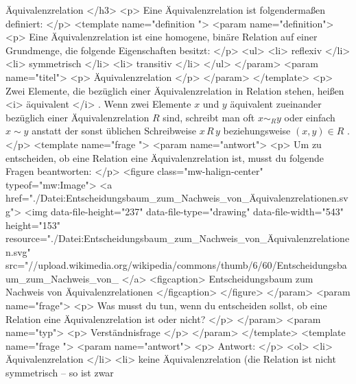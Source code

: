    Äquivalenzrelation
  </h3>
  <p>
   Eine Äquivalenzrelation ist folgendermaßen definiert:
  </p>
  <template name="definition
 ">
   <param name="definition">
    <p>
     Eine Äquivalenzrelation ist eine homogene, binäre Relation auf einer Grundmenge, die folgende Eigenschaften besitzt:
    </p>
    <ul>
     <li>
      reflexiv
     </li>
     <li>
      symmetrisch
     </li>
     <li>
      transitiv
     </li>
    </ul>
   </param>
   <param name="titel">
    <p>
     Äquivalenzrelation
    </p>
   </param>
  </template>
  <p>
   Zwei Elemente, die bezüglich einer Äquivalenzrelation in Relation stehen, heißen
   <i>
    äquivalent
   </i>
   . Wenn zwei Elemente
   $x$
   und
   $y$
   äquivalent zueinander bezüglich einer Äquivalenzrelation
   $R$
   sind, schreibt man oft
   $x\sim_R y$
   oder einfach
   $x\sim y$
   anstatt der sonst üblichen Schreibweise
   $x\,R\,y$
   beziehungsweise
   $(x,y)\in R$
   .
  </p>
  <template name="frage
 ">
   <param name="antwort">
    <p>
     Um zu entscheiden, ob eine Relation eine Äquivalenzrelation ist, musst du folgende Fragen beantworten:
    </p>
    <figure class="mw-halign-center" typeof="mw:Image">
     <a href="./Datei:Entscheidungsbaum_zum_Nachweis_von_Äquivalenzrelationen.svg">
      <img data-file-height="237" data-file-type="drawing" data-file-width="543" height="153" resource="./Datei:Entscheidungsbaum_zum_Nachweis_von_Äquivalenzrelationen.svg" src="//upload.wikimedia.org/wikipedia/commons/thumb/6/60/Entscheidungsbaum_zum_Nachweis_von_%
     </a>
     <figcaption>
      Entscheidungsbaum zum Nachweis von Äquivalenzrelationen
     </figcaption>
    </figure>
   </param>
   <param name="frage">
    <p>
     Was musst du tun, wenn du entscheiden sollst, ob eine Relation eine Äquivalenzrelation ist oder nicht?
    </p>
   </param>
   <param name="typ">
    <p>
     Verständnisfrage
    </p>
   </param>
  </template>
  <template name="frage
 ">
   <param name="antwort">
    <p>
     Antwort:
    </p>
    <ol>
     <li>
      Äquivalenzrelation
     </li>
     <li>
      keine Äquivalenzrelation (die Relation ist nicht symmetrisch – so ist zwar
